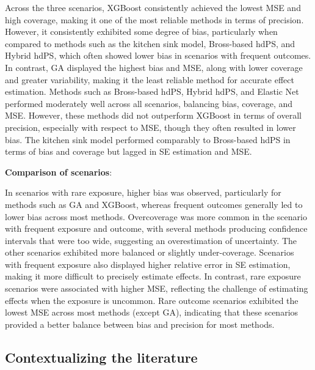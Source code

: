\documentclass[sn-vancouver,Numbered,lineno,pdflatex]{sn-jnl}
\begin{document}
Across the three scenarios, XGBoost consistently achieved the lowest MSE
and high coverage, making it one of the most reliable methods in terms
of precision. However, it consistently exhibited some degree of bias,
particularly when compared to methods such as the kitchen sink model,
Bross-based hdPS, and Hybrid hdPS, which often showed lower bias in
scenarios with frequent outcomes. In contrast, GA displayed the highest
bias and MSE, along with lower coverage and greater variability, making
it the least reliable method for accurate effect estimation. Methods
such as Bross-based hdPS, Hybrid hdPS, and Elastic Net performed
moderately well across all scenarios, balancing bias, coverage, and MSE.
However, these methods did not outperform XGBoost in terms of overall
precision, especially with respect to MSE, though they often resulted in
lower bias. The kitchen sink model performed comparably to Bross-based
hdPS in terms of bias and coverage but lagged in SE estimation and MSE.

\textbf{Comparison of scenarios}:

In scenarios with rare exposure, higher bias was observed, particularly
for methods such as GA and XGBoost, whereas frequent outcomes generally
led to lower bias across most methods. Overcoverage was more common in
the scenario with frequent exposure and outcome, with several methods
producing confidence intervals that were too wide, suggesting an
overestimation of uncertainty. The other scenarios exhibited more
balanced or slightly under-coverage. Scenarios with frequent exposure
also displayed higher relative error in SE estimation, making it more
difficult to precisely estimate effects. In contrast, rare exposure
scenarios were associated with higher MSE, reflecting the challenge of
estimating effects when the exposure is uncommon. Rare outcome scenarios
exhibited the lowest MSE across most methods (except GA), indicating
that these scenarios provided a better balance between bias and
precision for most methods.

\subsection{Contextualizing the
literature}\label{contextualizing-the-literature}
\end{document}
